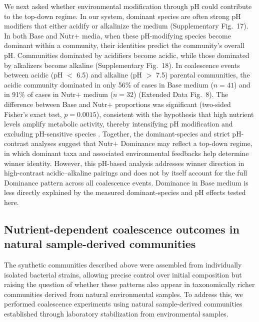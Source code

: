 We next asked whether environmental modification through pH could contribute to the top-down regime. In our system, dominant species are often strong pH modifiers that either acidify or alkalinize the medium (Supplementary Fig.~17). In both Base and Nutr$+$ media, when these pH-modifying species become dominant within a community, their identities predict the community's overall pH. Communities dominated by acidifiers become acidic, while those dominated by alkalizers become alkaline (Supplementary Fig.~18). In coalescence events between acidic (pH $<$ 6.5) and alkaline (pH $>$ 7.5) parental communities, the acidic community dominated in only 56\% of cases in Base medium ($n = 41$) and in 91\% of cases in Nutr$+$ medium ($n = 32$) (Extended Data Fig.~8). The difference between Base and Nutr$+$ proportions was significant (two-sided Fisher's exact test, $p = 0.0015$), consistent with the hypothesis that high nutrient levels amplify metabolic activity, thereby intensifying pH modification and excluding pH-sensitive species \citep{Ratzke2018, Ratzke2020}. Together, the dominant-species and strict pH-contrast analyses suggest that Nutr$+$ Dominance may reflect a top-down regime, in which dominant taxa and associated environmental feedbacks help determine winner identity. However, this pH-based analysis addresses winner direction in high-contrast acidic--alkaline pairings and does not by itself account for the full Dominance pattern across all coalescence events. Dominance in Base medium is less directly explained by the measured dominant-species and pH effects tested here.


\subsection{\texorpdfstring{Nutrient-dependent coalescence outcomes in natural sample-derived communities}{Nutrient-dependent coalescence outcomes in natural sample-derived communities}}
\label{sec:results:natural_communities}

The synthetic communities described above were assembled from individually isolated bacterial strains, allowing precise control over initial composition but raising the question of whether these patterns also appear in taxonomically richer communities derived from natural environmental samples. To address this, we performed coalescence experiments using natural sample-derived communities established through laboratory stabilization from environmental samples.

